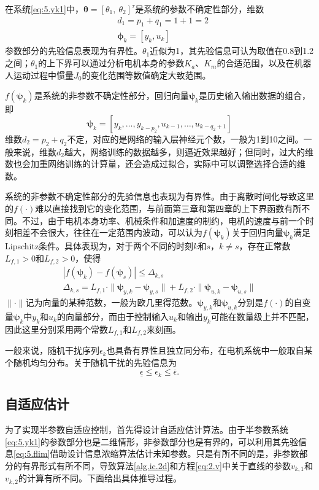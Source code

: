 在系统\eqref{eq:5.yk1}中，$\bm{\theta}=[\theta_{1},\ \theta_{2}]^{\tau}$是系统的参数不确定性部分，维数
\begin{equation}%
\begin{array}{cc}
&d_{1}=p_{1}+q_{1}=1+1=2\\
&\bm{\phi}_{k}=[y_{k},u_{k}]
\end{array}
\end{equation}
参数部分的先验信息表现为有界性。$\theta_{1}$近似为1，其先验信息可认为取值在0.8到1.2之间；$\theta_{1}$的上下界可以通过分析电机本身的参数$K_{a}$、$K_{m}$的合适范围，以及在机器人运动过程中惯量$J_{0}$的变化范围等数值确定大致范围。

$f(\bm{\psi}_{k})$是系统的非参数不确定性部分，回归向量$\bm{\psi}_{k}$是历史输入输出数据的组合，即
$$\bm{\psi}_{k}=[y_{k},\ldots,y_{k-p_{2}},u_{k-1},\dots,u_{k-q_{2}+1}]$$
维数$d_{2}=p_{2}+q_{2}$不定，对应的是网络的输入层神经元个数，一般为1到10之间。一般来说，维数$d_{2}$越大，网络训练的数据越多，则逼近效果越好；但同时，过大的维数也会加重网络训练的计算量，还会造成过拟合，实际中可以调整选择合适的维数。

系统的非参数不确定性部分的先验信息也表现为有界性。由于离散时间化导致这里的$f(\cdot)$难以直接找到它的变化范围，与前面第三章和第四章的上下界函数有所不同。不过，由于电机本身功率、机械条件和加速度的制约，电机的速度与前一个时刻相差不会很大，往往在一定范围内波动，可以认为$f(\bm{\psi}_{k})$关于回归向量$\bm{\psi}_{k}$满足Lipschitz条件。具体表现为，对于两个不同的时刻$k$和$s$，$k\neq s$，存在正常数$L_{f,1}>0$和$L_{f,2}>0$，使得
\begin{equation}\label{eq:5.flim}
\begin{array}{c}
|f(\bm{\psi}_{k})-f(\bm{\psi}_{s})|\leq \Delta_{k,s}\\
\Delta_{k,s}=L_{f,1}\cdot\|\bm{\psi}_{y,k}-\bm{\psi}_{y,s}\|+L_{f,2}\cdot\|\bm{\psi}_{u,k}-\bm{\psi}_{u,s}\|
\end{array}
\end{equation}
$\|\cdot\|$记为向量的某种范数，一般为欧几里得范数。$\bm{\psi}_{y,k}$和$\bm{\psi}_{u,k}$分别是$f(\cdot)$的自变量$\bm{\psi}_{k}$中$y_{k}$和$u_{k}$的向量部分，而由于控制输入$u_{k}$和输出$y_{k}$可能在数量级上并不匹配，因此这里分别采用两个常数$L_{f,1}$和$L_{f,2}$来刻画。

一般来说，随机干扰序列$\epsilon_{k}$也具备有界性且独立同分布，在电机系统中一般取自某个随机均匀分布。关于随机干扰的先验信息为
$$\underline{\epsilon}\leq\epsilon_{k}\leq\overline{\epsilon}.$$

\subsection{自适应估计}\label{5.2.2}
为了实现半参数自适应控制，首先得设计自适应估计算法。由于半参数系统\eqref{eq:5.yk1}的参数部分也是二维情形，非参数部分也是有界的，可以利用其先验信息\eqref{eq:5.flim}借助设计信息浓缩算法估计未知参数。只是有所不同的是，非参数部分的有界形式有所不同，导致算法\ref{alg.ic.2d}和方程\eqref{eq:2.v}中关于直线的参数$v_{k,1}$和$v_{k,2}$的计算有所不同。下面给出具体推导过程。

